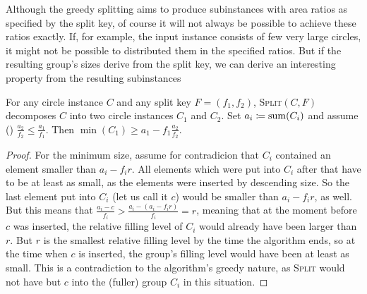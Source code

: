 \documentclass[a4paper,style=print,bibliography=totoc,nexus,lnum,extramargin]{tubsbook}
\begin{document}
Although the greedy splitting aims to produce subinstances with area ratios as specified by the split key, of course it will not always be possible to achieve these ratios exactly. If, for example, the input instance consists of few very large circles, it might not be possible to distributed them in the specified ratios.
But if the resulting group's sizes derive from the split key, we can derive an interesting property from the resulting subinstances 

\begin{lemma}\label{th:split-property}
    For any circle instance $C$ and any split key $F = (f_1, f_2)$, \textsc{Split}$(C,F)$ decomposes $C$ into two circle instances $C_1$ and $C_2$. Set $a_i \coloneqq \operatorname{sum}(C_i)$ and assume (\wlofg) $\frac{a_2}{f_2} \le \frac{a_1}{f_1}$.
    Then $\min(C_1) \ge a_1 - f_1\frac{a_2}{f_2}$.


\end{lemma}

\begin{proof}
    For the minimum size, assume for contradicion that $C_i$ contained an element smaller than $a_i - f_i r$. All elements which were put into $C_i$ after that have to be at least as small, as the elements were inserted by descending size. So the last element put into $C_i$ (let us call it $c$) would be smaller than $a_i - f_i r$, as well.
    But this means that $\frac{a_i - c}{f_i} > \frac{a_i - (a_i - f_i r)}{f_i} = r$, meaning that at the moment before $c$ was inserted, the relative filling level of $C_i$ would already have been larger than $r$. But $r$ is the smallest relative filling level by the time the algorithm ends, so at the time when $c$ is inserted, the group's filling level would have been at least as small.
    This is a contradiction to the algorithm's greedy nature, as \textsc{Split} would not have but $c$ into the (fuller) group $C_i$ in this situation.
\end{proof}
\end{document}

